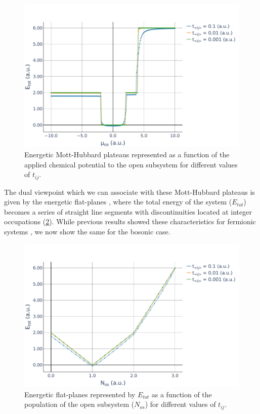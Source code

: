 \documentclass[twoside,twocolumn,9pt]{article}
\begin{document}
\begin{center}
  \begin{figure}
      \includegraphics[width=\linewidth]{../code/figures/BH-3in3-EvsMu.pdf}
      \caption{Energetic Mott-Hubbard plateaus represented as a function of the applied chemical potential to the open subsystem for different values of $t_{ij}$.}
      \label{fig:energetic-plateaus}
  \end{figure}
\end{center}
The dual viewpoint which we can associate with these Mott-Hubbard plateaus is given by the energetic flat-planes \cite{perdew1982, cohen2008, cohen2012, yang2016}, where the total energy of the system ($E_{tot}$) becomes a series of straight line segments with discontinuities located at integer occupations (\cref{fig:flat-planes}). While previous results showed these characteristics for fermionic systems \cite{devriendt2021, devriendt2022}, we now show the same for the bosonic case.
\begin{center}
  \begin{figure}
      \includegraphics[width=\linewidth]{../code/figures/BH-3in3-EvsN.pdf}
      \caption{Energetic flat-planes represented by $E_{tot}$ as a function of the population of the open subsystem ($N_{os}$) for different values of $t_{ij}$.}
      \label{fig:flat-planes}
  \end{figure}
\end{center}
\end{document}
